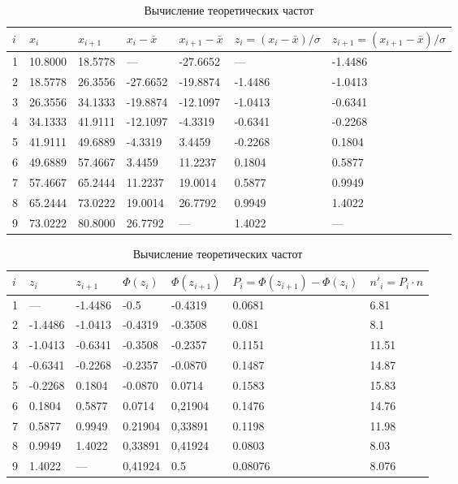 \documentclass{article}
\theoremstyle{problemstyle}
\begin{document}
\begin{table}[H]
  \centering
  \begin{tabular}{|l|l|l|l|l|l|l|}
    \hline
    \(i\) & \(x_i\) & \(x_{i+1}\) & \(x_i - \bar x\) & \(x_{i+1} - \bar x\)
    & \(z_i = (x_i -\bar x)/\sigma\) & \(z_{i+1} = (x_{i+1} - \bar x)/\sigma\) \\
\hline
1 & 10.8000 & 18.5778 & --- & -27.6652 & --- & -1.4486 \\
\hline
2 & 18.5778 & 26.3556 & -27.6652 & -19.8874 & -1.4486 & -1.0413 \\
\hline
3 & 26.3556 & 34.1333 & -19.8874 & -12.1097 & -1.0413 & -0.6341 \\
\hline
4 & 34.1333 & 41.9111 & -12.1097 & -4.3319 & -0.6341 & -0.2268 \\
\hline
5 & 41.9111 & 49.6889 & -4.3319 & 3.4459 & -0.2268 & 0.1804 \\
\hline
6 & 49.6889 & 57.4667 & 3.4459 & 11.2237 & 0.1804 & 0.5877 \\
\hline
7 & 57.4667 & 65.2444 & 11.2237 & 19.0014 & 0.5877 & 0.9949 \\
\hline
8 & 65.2444 & 73.0222 & 19.0014 & 26.7792 & 0.9949 & 1.4022 \\
\hline
9 & 73.0222 & 80.8000 & 26.7792 & --- & 1.4022 & --- \\
\hline
  \end{tabular}
  \caption{Вычисление теоретических частот}\label{table:theoretical}
\end{table}

\begin{table}[H]
  \centering
  \begin{tabular}{|l||l|l||l|l||l|l|}
    \hline
    \(i\) & \(z_i\) & \(z_{i+1}\) & 
    \(\Phi(z_i)\) & \(\Phi(z_{i+1})\) &
    \(P_i = \Phi(z_{i+1}) - \Phi(z_i)\) &
    \(n'_i = P_i \cdot n\)
    \\
    \hline
    1 & ---     & -1.4486 & -0.5    & -0.4319 & 0.0681 & 6.81 \\
    \hline
    2 & -1.4486 & -1.0413 & -0.4319 & -0.3508 & 0.081 & 8.1 \\
    \hline
    3 & -1.0413 & -0.6341 & -0.3508 & -0.2357 & 0.1151 & 11.51 \\
    \hline
    4 & -0.6341 & -0.2268 & -0.2357 & -0.0870 & 0.1487 & 14.87 \\
    \hline
    5 & -0.2268 & 0.1804  & -0.0870 & 0.0714  & 0.1583 & 15.83 \\
    \hline
    6 & 0.1804  & 0.5877  & 0.0714  & 0,21904 & 0.1476 & 14.76 \\
    \hline
    7 & 0.5877  & 0.9949  & 0.21904 & 0,33891 & 0.1198 & 11.98 \\
    \hline
    8 & 0.9949  & 1.4022  & 0,33891 & 0,41924 & 0.0803 & 8.03  \\
    \hline
    9 & 1.4022  & ---     & 0,41924 & 0.5     & 0.08076 & 8.076\\
    \hline
  \end{tabular}
  \caption{Вычисление теоретических частот}\label{table:theoretical_2}
\end{table}
\end{document}
